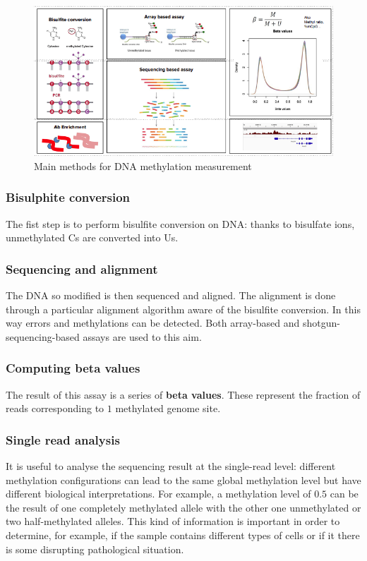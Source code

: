 \begin{figure}[H]
\centering
    \includegraphics[width=0.8\linewidth]{methods.png}
    \caption{Main methods for DNA methylation measurement}
    \label{fig:met-measure}
\end{figure}

        \subsubsection{Bisulphite conversion}
        The fist step is to perform bisulfite conversion on DNA: thanks to bisulfate ions, unmethylated Cs are converted into Us.


        \subsubsection{Sequencing and alignment}
        The DNA so modified is then sequenced and aligned.
        The alignment is done through a particular alignment algorithm aware of the bisulfite conversion.
        In this way errors and methylations can be detected.
        Both array-based and shotgun-sequencing-based assays are used to this aim.

        \subsubsection{Computing beta values}
        The result of this assay is a series of \textbf{beta values}.
        These represent the fraction of reads corresponding to $1$ methylated genome site.

        \subsubsection{Single read analysis}
        It is useful to analyse the sequencing result at the single-read level: different methylation configurations can lead to the same global methylation level but have different biological interpretations.
        For example, a methylation level of $0.5$ can be the result of one completely methylated allele with the other one unmethylated or two half-methylated alleles.
        This kind of information is important in order to determine, for example, if the sample contains different types of cells or if it there is some disrupting pathological situation.

